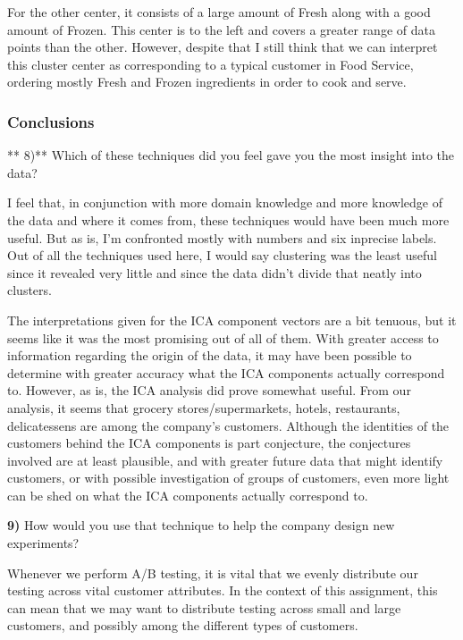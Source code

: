 \documentclass{article}
\begin{document}
For the other center, it consists of a large amount of Fresh along with
a good amount of Frozen. This center is to the left and covers a greater
range of data points than the other. However, despite that I still think
that we can interpret this cluster center as corresponding to a typical
customer in Food Service, ordering mostly Fresh and Frozen ingredients
in order to cook and serve.

    \subsubsection{Conclusions}\label{conclusions}

** 8)** Which of these techniques did you feel gave you the most insight
into the data?

    I feel that, in conjunction with more domain knowledge and more
knowledge of the data and where it comes from, these techniques would
have been much more useful. But as is, I'm confronted mostly with
numbers and six inprecise labels. Out of all the techniques used here, I
would say clustering was the least useful since it revealed very little
and since the data didn't divide that neatly into clusters.

The interpretations given for the ICA component vectors are a bit
tenuous, but it seems like it was the most promising out of all of them.
With greater access to information regarding the origin of the data, it
may have been possible to determine with greater accuracy what the ICA
components actually correspond to. However, as is, the ICA analysis did
prove somewhat useful. From our analysis, it seems that grocery
stores/supermarkets, hotels, restaurants, delicatessens are among the
company's customers. Although the identities of the customers behind the
ICA components is part conjecture, the conjectures involved are at least
plausible, and with greater future data that might identify customers,
or with possible investigation of groups of customers, even more light
can be shed on what the ICA components actually correspond to.

    \textbf{9)} How would you use that technique to help the company design
new experiments?

    Whenever we perform A/B testing, it is vital that we evenly distribute
our testing across vital customer attributes. In the context of this
assignment, this can mean that we may want to distribute testing across
small and large customers, and possibly among the different types of
customers.
\end{document}
